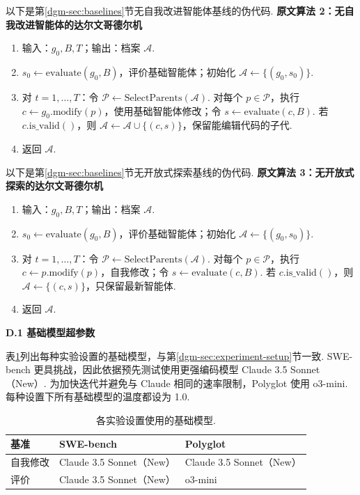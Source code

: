 以下是第\ref{dgm-sec:baselines}节无自我改进智能体基线的伪代码.
\label{dgm-alg:dgm-wo-selfimprove}
\noindent\textbf{原文算法 2：无自我改进智能体的达尔文哥德尔机}
\begin{enumerate}
\item 输入：$g_0,B,T$；输出：档案 $\mathcal A$.
\item $s_0\leftarrow\mathrm{evaluate}(g_0,B)$，评价基础智能体；初始化 $\mathcal A\leftarrow\{(g_0,s_0)\}$.
\item 对 $t=1,\ldots,T$：令 $\mathcal P\leftarrow\mathrm{SelectParents}(\mathcal A)$. 对每个 $p\in\mathcal P$，执行 $c\leftarrow g_0.\mathrm{modify}(p)$，使用基础智能体修改；令 $s\leftarrow\mathrm{evaluate}(c,B)$. 若 $c.\mathrm{is\_valid}()$，则 $\mathcal A\leftarrow\mathcal A\cup\{(c,s)\}$，保留能编辑代码的子代.
\item 返回 $\mathcal A$.
\end{enumerate}

以下是第\ref{dgm-sec:baselines}节无开放式探索基线的伪代码.
\label{dgm-alg:dgm-wo-openended}
\noindent\textbf{原文算法 3：无开放式探索的达尔文哥德尔机}
\begin{enumerate}
\item 输入：$g_0,B,T$；输出：档案 $\mathcal A$.
\item $s_0\leftarrow\mathrm{evaluate}(g_0,B)$，评价基础智能体；初始化 $\mathcal A\leftarrow\{(g_0,s_0)\}$.
\item 对 $t=1,\ldots,T$：令 $\mathcal P\leftarrow\mathrm{SelectParents}(\mathcal A)$. 对每个 $p\in\mathcal P$，执行 $c\leftarrow p.\mathrm{modify}(p)$，自我修改；令 $s\leftarrow\mathrm{evaluate}(c,B)$. 若 $c.\mathrm{is\_valid}()$，则 $\mathcal A\leftarrow\{(c,s)\}$，只保留最新智能体.
\item 返回 $\mathcal A$.
\end{enumerate}

\noindent\textbf{D.1 基础模型超参数}\label{dgm-app:fm-hyperparam}\par
表\ref{dgm-tab:fm-hyperparam}列出每种实验设置的基础模型，与第\ref{dgm-sec:experiment-setup}节一致. SWE-bench 更具挑战，因此依据预先测试使用更强编码模型 Claude 3.5 Sonnet（New）. 为加快迭代并避免与 Claude 相同的速率限制，Polyglot 使用 o3-mini. 每种设置下所有基础模型的温度都设为 1.0.
\begin{table}[ht]
\centering\caption{各实验设置使用的基础模型.}\label{dgm-tab:fm-hyperparam}
\begin{tabular}{lll}\toprule 基准&SWE-bench&Polyglot\\\midrule
自我修改&Claude 3.5 Sonnet（New）&Claude 3.5 Sonnet（New）\\
评价&Claude 3.5 Sonnet（New）&o3-mini\\\bottomrule\end{tabular}
\end{table}

